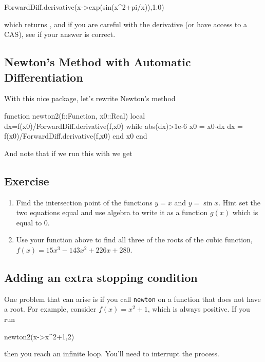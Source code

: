 \begin{jlblock}[root]
ForwardDiff.derivative(x->exp(sin(x^2+pi/x)),1.0)
\end{jlblock}
% 
which returns \printpythontex[verb], and if you are careful with the derivative (or have access to a CAS), see if your answer is correct.

\subsection{Newton's Method with Automatic Differentiation}

With this nice package, let's rewrite Newton's method 

\begin{jlblock}[root]
function newton2(f::Function, x0::Real)
  local dx=f(x0)/ForwardDiff.derivative(f,x0)
  while abs(dx)>1e-6
    x0 = x0-dx
    dx = f(x0)/ForwardDiff.derivative(f,x0)
  end
  x0
end
\end{jlblock}

And note that if we run this with  we get
\stdoutpythontex[verbatim]




\subsection{Exercise}

\begin{enumerate}
\item Find the intersection point of the functions $y=x$ and $y=\sin x$.  Hint set the two equations equal and use algebra to write it as a function $g(x)$ which is equal to 0.   
\item  Use your function above to find all three of the roots of the cubic
  function, $f(x)=15{x}^{3}-143{x}^2+226x+280$.
  
\end{enumerate}

\subsection{Adding an extra stopping condition}

One problem that can arise is if you call \texttt{newton} on a function that does not have a root. For example, consider $f(x)=x^2+1$, which is always positive.  If you run
\begin{jlverbatim}
newton2(x->x^2+1,2)
\end{jlverbatim}
then you reach an infinite loop.  You'll need to interrupt the process. 


